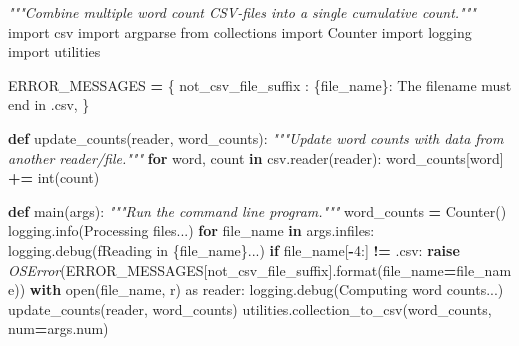 \documentclass[
]{krantz}
\makeatletter
\newenvironment{Shaded}{\begin{snugshade}}{\end{snugshade}}
\newcommand{\BuiltInTok}[1]{#1}
\newcommand{\CommentTok}[1]{\textcolor[rgb]{0.56,0.35,0.01}{\textit{#1}}}
\newcommand{\ControlFlowTok}[1]{\textcolor[rgb]{0.13,0.29,0.53}{\textbf{#1}}}
\newcommand{\DecValTok}[1]{\textcolor[rgb]{0.00,0.00,0.81}{#1}}
\newcommand{\ImportTok}[1]{#1}
\newcommand{\KeywordTok}[1]{\textcolor[rgb]{0.13,0.29,0.53}{\textbf{#1}}}
\newcommand{\NormalTok}[1]{#1}
\newcommand{\OperatorTok}[1]{\textcolor[rgb]{0.81,0.36,0.00}{\textbf{#1}}}
\newcommand{\PreprocessorTok}[1]{\textcolor[rgb]{0.56,0.35,0.01}{\textit{#1}}}
\newcommand{\SpecialCharTok}[1]{\textcolor[rgb]{0.00,0.00,0.00}{#1}}
\newcommand{\SpecialStringTok}[1]{\textcolor[rgb]{0.31,0.60,0.02}{#1}}
\newcommand{\StringTok}[1]{\textcolor[rgb]{0.31,0.60,0.02}{#1}}
\newenvironment{kframe}{%
\medskip{}
\setlength{\fboxsep}{.8em}
 \def\at@end@of@kframe{}%
 \ifinner\ifhmode%
  \def\at@end@of@kframe{\end{minipage}}%
  \begin{minipage}{\columnwidth}%
 \fi\fi%
 \def\FrameCommand##1{\hskip\@totalleftmargin \hskip-\fboxsep
 \colorbox{shadecolor}{##1}\hskip-\fboxsep
     \hskip-\linewidth \hskip-\@totalleftmargin \hskip\columnwidth}%
 \MakeFramed {\advance\hsize-\width
   \@totalleftmargin\z@ \linewidth\hsize
   \@setminipage}}%
 {\par\unskip\endMakeFramed%
 \at@end@of@kframe}
\renewenvironment{Shaded}{\begin{kframe}}{\end{kframe}}
\makeatother
\begin{document}
\begin{Shaded}
\begin{Highlighting}[]
\CommentTok{"""Combine multiple word count CSV{-}files into a single cumulative count."""}
\ImportTok{import}\NormalTok{ csv}
\ImportTok{import}\NormalTok{ argparse}
\ImportTok{from}\NormalTok{ collections }\ImportTok{import}\NormalTok{ Counter}
\ImportTok{import}\NormalTok{ logging}
\ImportTok{import}\NormalTok{ utilities}


\NormalTok{ERROR\_MESSAGES }\OperatorTok{=}\NormalTok{ \{}
    \StringTok{\textquotesingle{}not\_csv\_file\_suffix\textquotesingle{}}\NormalTok{ : }\StringTok{\textquotesingle{}}\SpecialCharTok{\{file\_name\}}\StringTok{: The filename must end in \textasciigrave{}.csv\textasciigrave{}\textquotesingle{}}\NormalTok{,}
\NormalTok{\}}

\KeywordTok{def}\NormalTok{ update\_counts(reader, word\_counts):}
    \CommentTok{"""Update word counts with data from another reader/file."""}
    \ControlFlowTok{for}\NormalTok{ word, count }\KeywordTok{in}\NormalTok{ csv.reader(reader):}
\NormalTok{        word\_counts[word] }\OperatorTok{+=} \BuiltInTok{int}\NormalTok{(count)}

\KeywordTok{def}\NormalTok{ main(args):}
    \CommentTok{"""Run the command line program."""}
\NormalTok{    word\_counts }\OperatorTok{=}\NormalTok{ Counter()}
\NormalTok{    logging.info(}\StringTok{\textquotesingle{}Processing files...\textquotesingle{}}\NormalTok{)}
    \ControlFlowTok{for}\NormalTok{ file\_name }\KeywordTok{in}\NormalTok{ args.infiles:}
\NormalTok{        logging.debug(}\SpecialStringTok{f\textquotesingle{}Reading in }\SpecialCharTok{\{}\NormalTok{file\_name}\SpecialCharTok{\}}\SpecialStringTok{...\textquotesingle{}}\NormalTok{)}
        \ControlFlowTok{if}\NormalTok{ file\_name[}\OperatorTok{{-}}\DecValTok{4}\NormalTok{:] }\OperatorTok{!=} \StringTok{\textquotesingle{}.csv\textquotesingle{}}\NormalTok{:}
            \ControlFlowTok{raise} \PreprocessorTok{OSError}\NormalTok{(ERROR\_MESSAGES[}\StringTok{\textquotesingle{}not\_csv\_file\_suffix\textquotesingle{}}\NormalTok{].}\BuiltInTok{format}\NormalTok{(file\_name}\OperatorTok{=}\NormalTok{file\_name))}
        \ControlFlowTok{with} \BuiltInTok{open}\NormalTok{(file\_name, }\StringTok{\textquotesingle{}r\textquotesingle{}}\NormalTok{) }\ImportTok{as}\NormalTok{ reader:}
\NormalTok{            logging.debug(}\StringTok{\textquotesingle{}Computing word counts...\textquotesingle{}}\NormalTok{)}
\NormalTok{            update\_counts(reader, word\_counts)}
\NormalTok{    utilities.collection\_to\_csv(word\_counts, num}\OperatorTok{=}\NormalTok{args.num)}


\end{Highlighting}
\end{Shaded}
\end{document}
